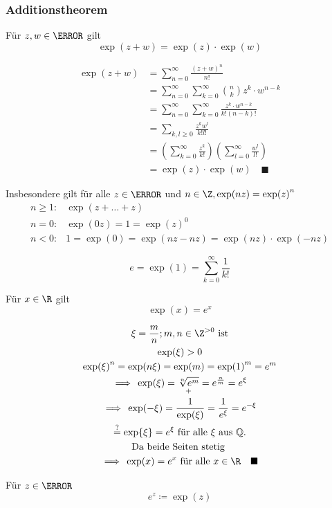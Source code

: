 \subsubsection{Additionstheorem}
Für $z, w \in \C$ gilt \\
\[ \exp(z+w) = \exp(z) \cdot \exp(w) \]
\begin{bew}
	\begin{align*}
		\exp(z+w)	&= \sum_{n=0}^\infty \frac{(z+w)^n}{n!} \\
				&= \sum_{n=0}^\infty \sum_{k=0}^\infty \binom{n}{k} z^k \cdot w^{n-k} \\
				&= \sum_{n=0}^\infty \sum_{k=0}^\infty \frac{z^k \cdot w^{n-k}}{k!(n-k)!} \\
				&= \sum_{k,l \geq 0} \frac{z^k w^l }{k!l!} \\
				&= \left( \sum_{k=0}^\infty \frac{z^k}{k!} \right) \left( \sum_{l=0}^\infty \frac{w^l}{l!} \right) \\
				&= \exp(z) \cdot \exp(w) \quad \blacksquare
	\end{align*}
\end{bew}
Insbesondere gilt für alle $z \in \C$ und $n \in \Z, \exp(nz) = \exp(z)^n$
\begin{align*}
	n \geq 1 :	&\exp(z+ \dots +z)		\\
	n = 0	 :	&\exp(0z) = 1 = \exp(z)^0	\\
	n < 0 :	&1 = \exp(0) = \exp(nz - nz) = \exp(nz) \cdot \exp(-nz)
\end{align*}

\begin{def*}[note = Eulersche Zahl , index = Eulersche Zahl]
	\[ e = \exp(1) = \sum_{k=0}^\infty \frac{1}{k!} \]
\end{def*}
\begin{satz*}
	Für $x \in \R$ gilt
	\[ \exp(x) = e^x \]
	\begin{bew}
		\begin{gather*}
			\xi = \frac{m}{n} ; m, n \in \Z^{> 0} \text{ ist} \\
			\exp(\xi) > 0 \\
			\exp(\xi)^n = \exp(n\xi) = \exp(m) = \exp(1)^m = e^m \\
			\implies \exp(\xi) = \underset{+}{\sqrt[n]{e^m}} = e^{\frac{n}{m}} = e^\xi \\
			\implies \exp(-\xi) = \frac{1}{\exp(\xi)} = \frac{1}{e^\xi} = e^{-\xi} \\
			\overset{?}{=} \exp{\xi} = e^\xi \text{ für alle } \xi \text{ aus } \Q . \\
			\text{Da beide Seiten stetig } \\
			\implies \exp(x) = e^x \text{ für alle } x \in \R \quad \blacksquare
		\end{gather*}
	\end{bew}
\end{satz*}
\begin{bem}[note = Abkürzung]
	Für $z \in \C$
	\[ e^z \coloneqq \exp(z) \]
\end{bem}

